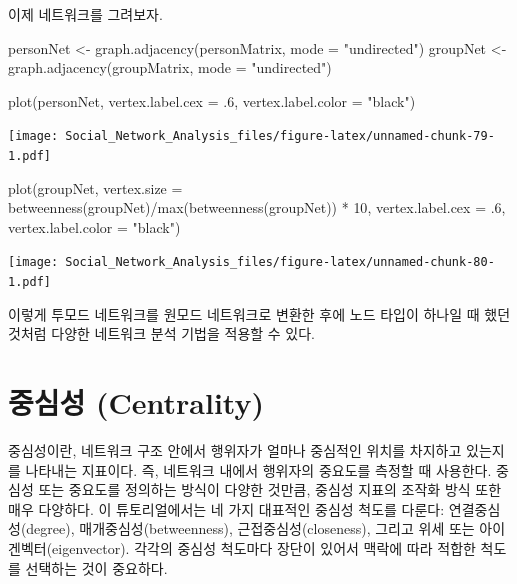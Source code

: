 \documentclass[
]{book}
\newenvironment{Shaded}{\begin{snugshade}}{\end{snugshade}}
\newcommand{\AttributeTok}[1]{\textcolor[rgb]{0.77,0.63,0.00}{#1}}
\newcommand{\DecValTok}[1]{\textcolor[rgb]{0.00,0.00,0.81}{#1}}
\newcommand{\FunctionTok}[1]{\textcolor[rgb]{0.00,0.00,0.00}{#1}}
\newcommand{\NormalTok}[1]{#1}
\newcommand{\OtherTok}[1]{\textcolor[rgb]{0.56,0.35,0.01}{#1}}
\newcommand{\SpecialCharTok}[1]{\textcolor[rgb]{0.00,0.00,0.00}{#1}}
\newcommand{\StringTok}[1]{\textcolor[rgb]{0.31,0.60,0.02}{#1}}
\begin{document}
이제 네트워크를 그려보자.

\begin{Shaded}
\begin{Highlighting}[]
\NormalTok{personNet }\OtherTok{\textless{}{-}} \FunctionTok{graph.adjacency}\NormalTok{(personMatrix, }\AttributeTok{mode =} \StringTok{"undirected"}\NormalTok{)}
\NormalTok{groupNet }\OtherTok{\textless{}{-}} \FunctionTok{graph.adjacency}\NormalTok{(groupMatrix, }\AttributeTok{mode =} \StringTok{"undirected"}\NormalTok{)}

\FunctionTok{plot}\NormalTok{(personNet, }\AttributeTok{vertex.label.cex =}\NormalTok{ .}\DecValTok{6}\NormalTok{, }\AttributeTok{vertex.label.color =} \StringTok{"black"}\NormalTok{)}
\end{Highlighting}
\end{Shaded}

\texttt{[image: Social\_Network\_Analysis\_files/figure-latex/unnamed-chunk-79-1.pdf]}

\begin{Shaded}
\begin{Highlighting}[]
\FunctionTok{plot}\NormalTok{(groupNet, }\AttributeTok{vertex.size =} \FunctionTok{betweenness}\NormalTok{(groupNet)}\SpecialCharTok{/}\FunctionTok{max}\NormalTok{(}\FunctionTok{betweenness}\NormalTok{(groupNet)) }\SpecialCharTok{*} \DecValTok{10}\NormalTok{, }\AttributeTok{vertex.label.cex =}\NormalTok{ .}\DecValTok{6}\NormalTok{, }\AttributeTok{vertex.label.color =} \StringTok{"black"}\NormalTok{)}
\end{Highlighting}
\end{Shaded}

\texttt{[image: Social\_Network\_Analysis\_files/figure-latex/unnamed-chunk-80-1.pdf]}

이렇게 투모드 네트워크를 원모드 네트워크로 변환한 후에 노드 타입이 하나일 때 했던 것처럼 다양한 네트워크 분석 기법을 적용할 수 있다.

\hypertarget{uxc911uxc2ecuxc131-centrality}{%
\chapter{중심성 (Centrality)}\label{uxc911uxc2ecuxc131-centrality}}

중심성이란, 네트워크 구조 안에서 행위자가 얼마나 중심적인 위치를 차지하고 있는지를 나타내는 지표이다. 즉, 네트워크 내에서 행위자의 중요도를 측정할 때 사용한다. 중심성 또는 중요도를 정의하는 방식이 다양한 것만큼, 중심성 지표의 조작화 방식 또한 매우 다양하다. 이 튜토리얼에서는 네 가지 대표적인 중심성 척도를 다룬다: 연결중심성(degree), 매개중심성(betweenness), 근접중심성(closeness), 그리고 위세 또는 아이겐벡터(eigenvector). 각각의 중심성 척도마다 장단이 있어서 맥락에 따라 적합한 척도를 선택하는 것이 중요하다.
\end{document}
